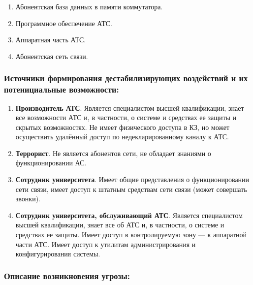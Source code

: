 \documentclass[12pt, russian, oneside, article]{ncc}
\begin{document}
\begin{enumerate}
\item Абонентская база данных в памяти коммутатора.
\item Программное обеспечение АТС.
\item Аппаратная часть АТС.
\item Абонентская сеть связи.
\end{enumerate}
\subsubsection{Источники формирования дестабилизирующих воздействий и их потенициальные возможности:}
\label{sec-2_1_2}


\begin{enumerate}
\item \textbf{Производитель АТС}. Является специалистом высшей квалификации, знает все возможности АТС и, в частности, о системе и средствах ее защиты и скрытых возможностях. Не имеет физического доступа в КЗ, но может осуществить удалённый доступ по недекларированному каналу к АТС.
\item \textbf{Террорист}. Не является абонентов сети, не обладает знаниями о функционировании АС.
\item \textbf{Сотрудник университета}. Имеет общие представления о функционировании сети связи, имеет доступ к штатным средствам сети связи (может совершать звонки).
\item \textbf{Сотрудник университета, обслуживающий АТС}. Является специалистом высшей квалификации, знает все об АТС и, в частности, о системе и средствах ее защиты. Имеет доступ в контролируемую зону --- к аппаратной части АТС. Имеет доступ к утилитам администрирования и конфигурирования системы.
\end{enumerate}
\subsubsection{Описание возникновения угрозы:}
\label{sec-2_1_3}
\end{document}
